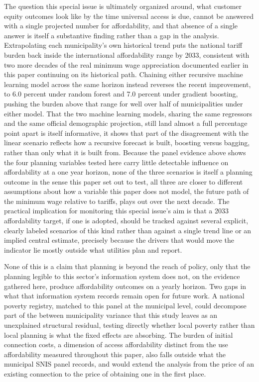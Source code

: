 \documentclass[pdflatex,sn-mathphys-num]{sn-jnl}%
\theoremstyle{thmstyleone}%
\theoremstyle{thmstyletwo}%
\theoremstyle{thmstylethree}%
\begin{document}
The question this special issue is ultimately organized around, what customer equity outcomes look like by the time universal access is due, cannot be answered with a single projected number for affordability, and that absence of a single answer is itself a substantive finding rather than a gap in the analysis. Extrapolating each municipality's own historical trend puts the national tariff burden back inside the international affordability range by 2033, consistent with two more decades of the real minimum wage appreciation documented earlier in this paper continuing on its historical path. Chaining either recursive machine learning model across the same horizon instead reverses the recent improvement, to 6.0 percent under random forest and 7.0 percent under gradient boosting, pushing the burden above that range for well over half of municipalities under either model. That the two machine learning models, sharing the same regressors and the same official demographic projection, still land almost a full percentage point apart is itself informative, it shows that part of the disagreement with the linear scenario reflects how a recursive forecast is built, boosting versus bagging, rather than only what it is built from. Because the panel evidence above shows the four planning variables tested here carry little detectable influence on affordability at a one year horizon, none of the three scenarios is itself a planning outcome in the sense this paper set out to test, all three are closer to different assumptions about how a variable this paper does not model, the future path of the minimum wage relative to tariffs, plays out over the next decade. The practical implication for monitoring this special issue's aim is that a 2033 affordability target, if one is adopted, should be tracked against several explicit, clearly labeled scenarios of this kind rather than against a single trend line or an implied central estimate, precisely because the drivers that would move the indicator lie mostly outside what utilities plan and report.

None of this is a claim that planning is beyond the reach of policy, only that the planning legible to this sector's information system does not, on the evidence gathered here, produce affordability outcomes on a yearly horizon. Two gaps in what that information system records remain open for future work. A national poverty registry, matched to this panel at the municipal level, could decompose part of the between municipality variance that this study leaves as an unexplained structural residual, testing directly whether local poverty rather than local planning is what the fixed effects are absorbing. The burden of initial connection costs, a dimension of access affordability distinct from the use affordability measured throughout this paper, also falls outside what the municipal SNIS panel records, and would extend the analysis from the price of an existing connection to the price of obtaining one in the first place.
\end{document}
